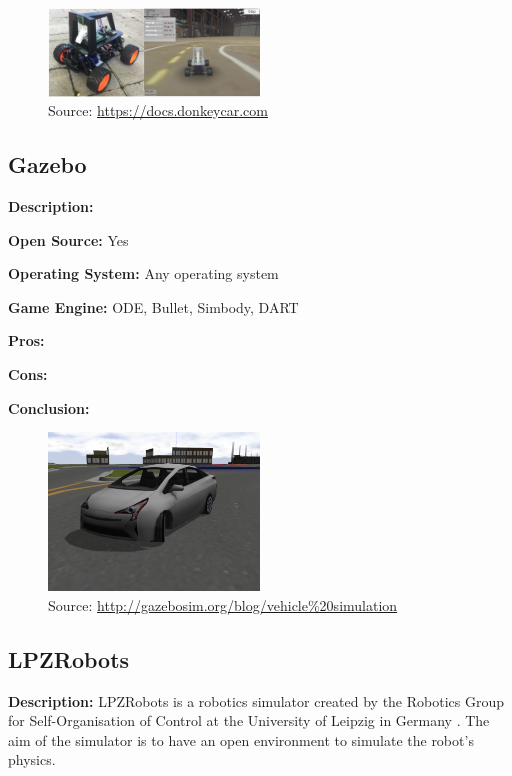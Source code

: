 \begin{figure}[H]
    \centering
    \includegraphics[width=0.5\textwidth]{Simulators/DonkeySim.jpg}
    \caption{Source: \url{https://docs.donkeycar.com}}
\end{figure}

\subsection{Gazebo}
\textbf{Description:}

\textbf{Open Source:} Yes

\textbf{Operating System:} Any operating system

\textbf{Game Engine:} ODE, Bullet, Simbody, DART

\textbf{Pros:}

\textbf{Cons:}

\textbf{Conclusion:} 


\begin{figure}[H]
    \centering
    \includegraphics[width=0.5\textwidth]{Simulators/gazebo.png}
    \caption{Source: \url{http://gazebosim.org/blog/vehicle\%20simulation}}
\end{figure}


\subsection{LPZRobots}
\textbf{Description:} LPZRobots is a robotics simulator created by the Robotics Group for Self-Organisation of Control at the University of Leipzig in Germany \cite{LPZRobots_Website, LPZRobots_book}. The aim of the simulator is to have an open environment to simulate the robot's physics. 

